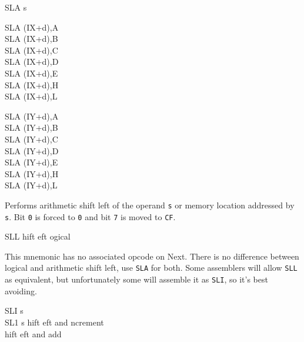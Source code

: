 \begin{basedescript}{
    \desclabelstyle{\multilinelabel}
    \desclabelwidth{3cm}}
\begin{DetailItem}{SLA s}
\begin{DetailVariants}
            \columnbreak
            SLA (IX+d),A\UNDOC\\
            SLA (IX+d),B\UNDOC\\
            SLA (IX+d),C\UNDOC\\
            SLA (IX+d),D\UNDOC\\
            SLA (IX+d),E\UNDOC\\
            SLA (IX+d),H\UNDOC\\
            SLA (IX+d),L\UNDOC

            \columnbreak
            SLA (IY+d),A\UNDOC\\
            SLA (IY+d),B\UNDOC\\
            SLA (IY+d),C\UNDOC\\
            SLA (IY+d),D\UNDOC\\
            SLA (IY+d),E\UNDOC\\
            SLA (IY+d),H\UNDOC\\
            SLA (IY+d),L\UNDOC
        \end{DetailVariants}

        Performs arithmetic shift left of the operand {\tt s} or memory location addressed by {\tt s}. Bit {\tt 0} is forced to {\tt 0} and bit {\tt 7} is moved to {\tt CF}.

        \begin{DetailEffects}[p]
            \FlagsSLAr
        \end{DetailEffects}
						
        \begin{DetailTiming}
        \end{DetailTiming}

    \end{DetailItem}

    \begin{DetailItem}{SLL}
        {hift eft ogical}
        {}

        This mnemonic has no associated opcode on Next. There is no difference between logical and arithmetic shift left, use {\tt SLA} for both. Some assemblers will allow {\tt SLL} as equivalent, but unfortunately some will assemble it as {\tt SLI}, so it's best avoiding.
		
    \end{DetailItem}

    \pagebreak
    \begin{DetailItem}{SLI s\UNDOC\\SL1 s\UNDOC}
        {hift eft and ncrement\\
        hift eft and add }
        {}
		

\end{DetailItem}
\end{basedescript}

